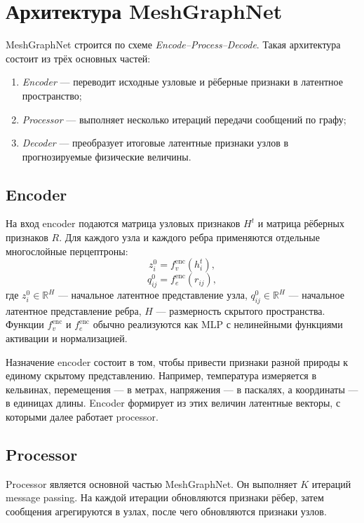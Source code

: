 \section{Архитектура MeshGraphNet}

MeshGraphNet строится по схеме \textit{Encode--Process--Decode}. Такая архитектура состоит из трёх основных частей:
\begin{enumerate}
    \item \textit{Encoder} --- переводит исходные узловые и рёберные признаки в латентное пространство;
    \item \textit{Processor} --- выполняет несколько итераций передачи сообщений по графу;
    \item \textit{Decoder} --- преобразует итоговые латентные признаки узлов в прогнозируемые физические величины.
\end{enumerate}

\subsection{Encoder}

На вход encoder подаются матрица узловых признаков $H^t$ и матрица рёберных признаков $R$. Для каждого узла и каждого ребра применяются отдельные многослойные перцептроны:
\begin{equation}
    z_i^0=f_v^{\mathrm{enc}}(h_i^t),
\end{equation}
\begin{equation}
    q_{ij}^0=f_e^{\mathrm{enc}}(r_{ij}),
\end{equation}
где $z_i^0\in\mathbb{R}^{H}$ --- начальное латентное представление узла, $q_{ij}^0\in\mathbb{R}^{H}$ --- начальное латентное представление ребра, $H$ --- размерность скрытого пространства. Функции $f_v^{\mathrm{enc}}$ и $f_e^{\mathrm{enc}}$ обычно реализуются как MLP с нелинейными функциями активации и нормализацией.

Назначение encoder состоит в том, чтобы привести признаки разной природы к единому скрытому представлению. Например, температура измеряется в кельвинах, перемещения --- в метрах, напряжения --- в паскалях, а координаты --- в единицах длины. Encoder формирует из этих величин латентные векторы, с которыми далее работает processor.

\subsection{Processor}

Processor является основной частью MeshGraphNet. Он выполняет $K$ итераций message passing. На каждой итерации обновляются признаки рёбер, затем сообщения агрегируются в узлах, после чего обновляются признаки узлов.

